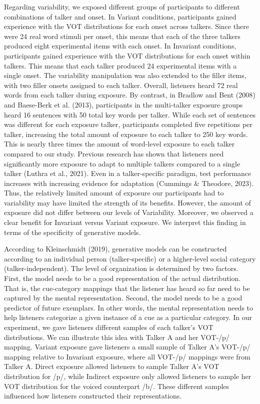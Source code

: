 \documentclass[
  12pt,
  twoside]{article}
\begin{document}
Regarding variability, we exposed different groups of participants to different combinations of talker and onset.
In Variant conditions, participants gained experience with the VOT distributions for each onset across talkers.
Since there were 24 real word stimuli per onset, this means that each of the three talkers produced eight experimental items with each onset.
In Invariant conditions, participants gained experience with the VOT distributions for each onset within talkers.
This means that each talker produced 24 experimental items with a single onset.
The variability manipulation was also extended to the filler items, with two filler onsets assigned to each talker.
Overall, listeners heard 72 real words from each talker during exposure.
By contrast, in Bradlow and Bent (2008) and Baese-Berk et al. (2013), participants in the multi-talker exposure groups heard 16 sentences with 50 total key words per talker.
While each set of sentences was different for each exposure talker, participants completed five repetitions per talker, increasing the total amount of exposure to each talker to 250 key words.
This is nearly three times the amount of word-level exposure to each talker compared to our study.
Previous research has shown that listeners need significantly more exposure to adapt to multiple talkers compared to a single talker (Luthra et al., 2021).
Even in a talker-specific paradigm, test performance increases with increasing evidence for adaptation (Cummings \& Theodore, 2023).
Thus, the relatively limited amount of exposure our participants had to variability may have limited the strength of its benefits.
However, the amount of exposure did not differ between our levels of Variability.
Moreover, we observed a clear benefit for Invariant versus Variant exposure.
We interpret this finding in terms of the specificity of generative models.

According to Kleinschmidt (2019), generative models can be constructed according to an individual person (talker-specific) or a higher-level social category (talker-independent).
The level of organization is determined by two factors.
First, the model needs to be a good representation of the actual distribution.
That is, the cue-category mappings that the listener has heard so far need to be captured by the mental representation.
Second, the model needs to be a good predictor of future exemplars.
In other words, the mental representation needs to help listeners categorize a given instance of a cue as a particular category.
In our experiment, we gave listeners different samples of each talker's VOT distributions.
We can illustrate this idea with Talker A and her VOT-/p/ mapping.
Variant exposure gave listeners a small sample of Talker A's VOT-/p/ mapping relative to Invariant exposure, where all VOT-/p/ mappings were from Talker A.
Direct exposure allowed listeners to sample Talker A's VOT distribution for /p/, while Indirect exposure only allowed listeners to sample her VOT distribution for the voiced counterpart /b/.
These different samples influenced how listeners constructed their representations.
\end{document}
